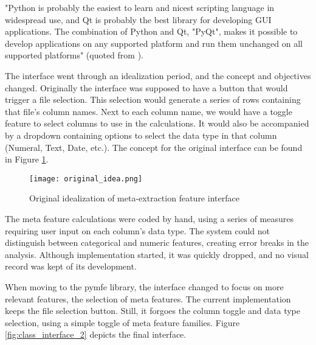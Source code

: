 "Python is probably the easiest to learn and nicest scripting language in widespread use, and Qt is probably the best library for developing GUI applications. The combination of Python and Qt, "PyQt", makes it possible to develop applications on any supported platform and run them unchanged on all supported platforms" (quoted from \cite{summerfield2007rapid}).


The interface went through an idealization period, and the concept and objectives changed. Originally the interface was supposed to have a button that would trigger a file selection. This selection would generate a series of rows containing that file's column names. Next to each column name, we would have a toggle feature to select columns to use in the calculations. It would also be accompanied by a dropdown containing options to select the data type in that column (Numeral, Text, Date, etc.). The concept for the original interface can be found in Figure \ref{fig:class_original_interface}. 

\begin{figure}[t]
  \begin{center}
    \leavevmode
    \texttt{[image: original\_idea.png]}
    \caption{Original idealization of meta-extraction feature interface}
    \label{fig:class_original_interface}
  \end{center}
\end{figure}

The meta feature calculations were coded by hand, using a series of measures requiring user input on each column's data type. The system could not distinguish between categorical and numeric features, creating error breaks in the analysis. Although implementation started, it was quickly dropped, and no visual record was kept of its development.

When moving to the pymfe library, the interface changed to focus on more relevant features, the selection of meta features. The current implementation keeps the file selection button. Still, it forgoes the column toggle and data type selection, using a simple toggle of meta feature families. Figure \ref{fig:class_interface_2} depicts the final interface. 



